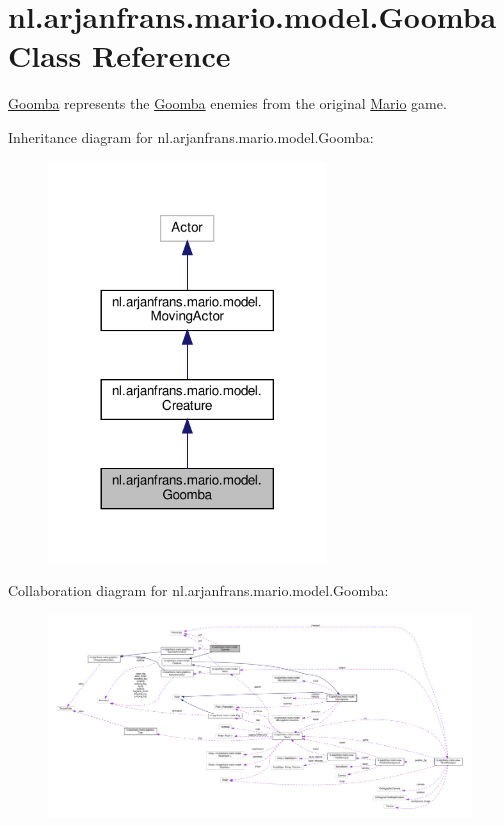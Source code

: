 \hypertarget{classnl_1_1arjanfrans_1_1mario_1_1model_1_1Goomba}{}\section{nl.\+arjanfrans.\+mario.\+model.\+Goomba Class Reference}
\label{classnl_1_1arjanfrans_1_1mario_1_1model_1_1Goomba}


\hyperlink{classnl_1_1arjanfrans_1_1mario_1_1model_1_1Goomba}{Goomba} represents the \hyperlink{classnl_1_1arjanfrans_1_1mario_1_1model_1_1Goomba}{Goomba} enemies from the original \hyperlink{classnl_1_1arjanfrans_1_1mario_1_1model_1_1Mario}{Mario} game.  




Inheritance diagram for nl.\+arjanfrans.\+mario.\+model.\+Goomba\+:
\nopagebreak
\begin{figure}[H]
\begin{center}
\leavevmode
\includegraphics[width=209pt]{classnl_1_1arjanfrans_1_1mario_1_1model_1_1Goomba__inherit__graph}
\end{center}
\end{figure}


Collaboration diagram for nl.\+arjanfrans.\+mario.\+model.\+Goomba\+:
\nopagebreak
\begin{figure}[H]
\begin{center}
\leavevmode
\includegraphics[width=350pt]{classnl_1_1arjanfrans_1_1mario_1_1model_1_1Goomba__coll__graph}
\end{center}
\end{figure}
